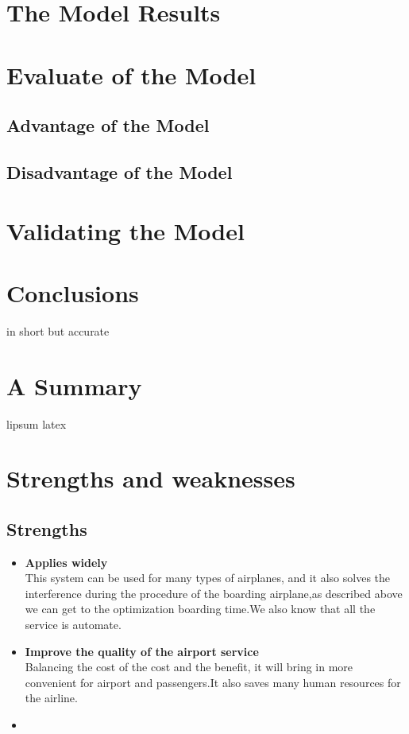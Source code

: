 \documentclass{mcmthesis}
\begin{document}
\section{The Model Results}


\section{Evaluate of the Model}
\subsection{Advantage of the Model}
\subsection{Disadvantage of the Model}

\section{Validating the Model}


\section{Conclusions}
in short but accurate

\section{A Summary}
\lipsum[6]
lipsum latex

\section{Strengths and weaknesses}
\lipsum[12]

\subsection{Strengths}
\begin{itemize}
	\item \textbf{Applies widely}\\
	This  system can be used for many types of airplanes, and it also
	solves the interference during  the procedure of the boarding
	airplane,as described above we can get to the  optimization
	boarding time.We also know that all the service is automate.
	\item \textbf{Improve the quality of the airport service}\\
	Balancing the cost of the cost and the benefit, it will bring in
	more convenient  for airport and passengers.It also saves many
	human resources for the airline. \item \textbf{}
\end{itemize}
\end{document}
